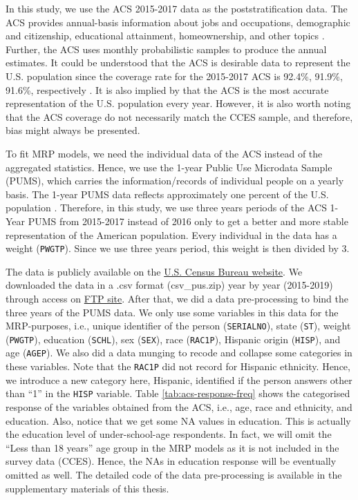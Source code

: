 \documentclass{monashthesis}
\begin{document}
In this study, we use the ACS 2015-2017 data as the poststratification data. The ACS provides annual-basis information about jobs and occupations, demographic and citizenship, educational attainment, homeownership, and other topics \autocite{acs_data_about}. Further, the ACS uses monthly probabilistic samples to produce the annual estimates. It could be understood that the ACS is desirable data to represent the U.S. population since the coverage rate for the 2015-2017 ACS is 92.4\%, 91.9\%, 91.6\%, respectively \autocite{acs_coverage_rate}. It is also implied by \textcite{GaoYuxiang2021IMRa} that the ACS is the most accurate representation of the U.S. population every year. However, it is also worth noting that the ACS coverage do not necessarily match the CCES sample, and therefore, bias might always be presented.

To fit MRP models, we need the individual data of the ACS instead of the aggregated statistics. Hence, we use the 1-year Public Use Microdata Sample (PUMS), which carries the information/records of individual people on a yearly basis. The 1-year PUMS data reflects approximately one percent of the U.S. population \autocite{pums_metadata}. Therefore, in this study, we use three years periods of the ACS 1-Year PUMS from 2015-2017 instead of 2016 only to get a better and more stable representation of the American population. Every individual in the data has a weight (\texttt{PWGTP}). Since we use three years period, this weight is then divided by 3.

The data is publicly available on the \href{https://www.census.gov/programs-surveys/acs/microdata/access.2015.html}{U.S. Census Bureau website}. We downloaded the data in a .csv format (csv\_pus.zip) year by year (2015-2019) through access on \href{https://www2.census.gov/programs-surveys/acs/data/pums/2015/1-Year/}{FTP site}. After that, we did a data pre-processing to bind the three years of the PUMS data. We only use some variables in this data for the MRP-purposes, i.e., unique identifier of the person (\texttt{SERIALNO}), state (\texttt{ST}), weight (\texttt{PWGTP}), education (\texttt{SCHL}), sex (\texttt{SEX}), race (\texttt{RAC1P}), Hispanic origin (\texttt{HISP}), and age (\texttt{AGEP}). We also did a data munging to recode and collapse some categories in these variables. Note that the \texttt{RAC1P} did not record for Hispanic ethnicity. Hence, we introduce a new category here, Hispanic, identified if the person answers other than ``1'' in the \texttt{HISP} variable. Table \ref{tab:acs-response-freq} shows the categorised response of the variables obtained from the ACS, i.e., age, race and ethnicity, and education. Also, notice that we get some NA values in education. This is actually the education level of under-school-age respondents. In fact, we will omit the ``Less than 18 years'' age group in the MRP models as it is not included in the survey data (CCES). Hence, the NAs in education response will be eventually omitted as well. The detailed code of the data pre-processing is available in the supplementary materials of this thesis.
\end{document}
